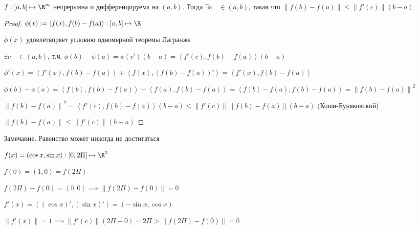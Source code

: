 
\begin{theorem} \thmslashn

    $f : [a, b] \mapsto \R^m$ непрерывна и дифференцируема на $(a, b)$. Тогда $\exists{c}\quad \in (a, b)$, такая что $\left\| f(b) - f(a) \right\| \le \left\| f'(c)\right\|(b - a)$
    \begin{proof} \thmslashn

	$\phi(x) := \left< f(x), f(b) - f(a)\right> : [a, b] \mapsto \R$

	$\phi(x)$ удовлетворяет условию одномерной теоремы Лагранжа

	$\exists{c} \quad \in (a, b)$, т.ч. $\phi(b) - \phi(a) = \phi(c')(b - a) = \left< f'(c), f(b) - f(a)\right>(b - a)$

	$\phi'(x) = \left< f'(x), f(b) - f(a)\right> + \left< f(x), (f(b) - f(a))'\right> = \left< f'(x), f(b) - f(a)\right>$

        $\phi(b) - \phi(a) = \left< f(b), f(b) - f(a)\right> - \left< f(a), f(b) - f(a)\right> = \left< f(b) - f(a), f(b) - f(a)\right> = \left\| f(b) - f(a) \right\|^2$

        $\left\| f(b) - f(a) \right\|^2 = \left< f'(c), f(b) - f(a)\right>(b - a) \le \left\| f'(c) \right\| \left\| f(b) - f(a) \right\| (b - a)$ (Коши-Буняковский)

        $\left\| f(b) - f(a)\right\| \le \left\| f'(c) \right\|(b - a)$
    \end{proof}
    \item Замечание. Равенство может никогда не достигаться 

	$f(x) = (\cos{x}, \sin{x}) : [0, 2\Pi] \mapsto \R^2$
 
	$f(0) = (1, 0) = f(2\Pi)$

	$f(2\Pi) - f(0) = (0, 0) \implies \left\| f(2\Pi) - f(0) \right\| = 0$

	$f'(x) = ((\cos{x})', (\sin{x})') = (-\sin{x}, \cos{x})$

	$\left\| f'(x) \right\| = 1 \implies \left\| f'(c) \right\| (2\Pi - 0) = 2\Pi > \left\| f(2\Pi) - f(0) \right\| = 0$

\end{theorem}

